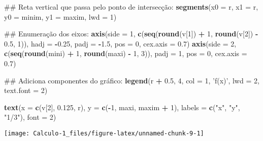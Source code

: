 \documentclass[]{book}
\newenvironment{Shaded}{\begin{snugshade}}{\end{snugshade}}
\newcommand{\KeywordTok}[1]{\textcolor[rgb]{0.13,0.29,0.53}{\textbf{#1}}}
\newcommand{\DataTypeTok}[1]{\textcolor[rgb]{0.13,0.29,0.53}{#1}}
\newcommand{\DecValTok}[1]{\textcolor[rgb]{0.00,0.00,0.81}{#1}}
\newcommand{\FloatTok}[1]{\textcolor[rgb]{0.00,0.00,0.81}{#1}}
\newcommand{\StringTok}[1]{\textcolor[rgb]{0.31,0.60,0.02}{#1}}
\newcommand{\OperatorTok}[1]{\textcolor[rgb]{0.81,0.36,0.00}{\textbf{#1}}}
\newcommand{\NormalTok}[1]{#1}
\begin{document}
\begin{enumerate}
\begin{Shaded}
\begin{Highlighting}[]
\NormalTok{##  Reta vertical que passa pelo ponto de intersecção:}
\KeywordTok{segments}\NormalTok{(}\DataTypeTok{x0 =}\NormalTok{ r, }\DataTypeTok{x1 =}\NormalTok{ r,}
     \DataTypeTok{y0 =}\NormalTok{ minim, }\DataTypeTok{y1 =}\NormalTok{ maxim, }\DataTypeTok{lwd =} \DecValTok{1}\NormalTok{)}

\NormalTok{##  Enumeração dos eixos:}
\KeywordTok{axis}\NormalTok{(}\DataTypeTok{side =} \DecValTok{1}\NormalTok{, }\KeywordTok{c}\NormalTok{(}\KeywordTok{seq}\NormalTok{(}\KeywordTok{round}\NormalTok{(v[}\DecValTok{1}\NormalTok{]) }\OperatorTok{+}\StringTok{ }\DecValTok{1}\NormalTok{, }\KeywordTok{round}\NormalTok{(v[}\DecValTok{2}\NormalTok{]) }\OperatorTok{-}\StringTok{ }\FloatTok{0.5}\NormalTok{, }\DecValTok{1}\NormalTok{)),}
 \DataTypeTok{hadj =} \OperatorTok{-}\FloatTok{0.25}\NormalTok{, }\DataTypeTok{padj =} \OperatorTok{-}\FloatTok{1.5}\NormalTok{, }\DataTypeTok{pos =} \DecValTok{0}\NormalTok{, }\DataTypeTok{cex.axis =} \FloatTok{0.7}\NormalTok{)}
\KeywordTok{axis}\NormalTok{(}\DataTypeTok{side =} \DecValTok{2}\NormalTok{, }\KeywordTok{c}\NormalTok{(}\KeywordTok{seq}\NormalTok{(}\KeywordTok{round}\NormalTok{(mini) }\OperatorTok{+}\StringTok{ }\DecValTok{1}\NormalTok{, }\KeywordTok{round}\NormalTok{(maxi) }\OperatorTok{-}\StringTok{ }\DecValTok{1}\NormalTok{, }\DecValTok{3}\NormalTok{)),}
 \DataTypeTok{padj =} \DecValTok{1}\NormalTok{, }\DataTypeTok{pos =} \DecValTok{0}\NormalTok{, }\DataTypeTok{cex.axis =} \FloatTok{0.7}\NormalTok{)}

\NormalTok{##  Adiciona componentes do gráfico:}
\KeywordTok{legend}\NormalTok{(r }\OperatorTok{+}\StringTok{ }\FloatTok{0.5}\NormalTok{, }\DecValTok{4}\NormalTok{, }\DataTypeTok{col =} \DecValTok{1}\NormalTok{, }\StringTok{'f(x)'}\NormalTok{, }\DataTypeTok{lwd =} \DecValTok{2}\NormalTok{, }\DataTypeTok{text.font =} \DecValTok{2}\NormalTok{)}

\KeywordTok{text}\NormalTok{(}\DataTypeTok{x =} \KeywordTok{c}\NormalTok{(v[}\DecValTok{2}\NormalTok{], }\FloatTok{0.125}\NormalTok{, r), }\DataTypeTok{y =} \KeywordTok{c}\NormalTok{(}\OperatorTok{-}\DecValTok{1}\NormalTok{, maxi, maxim }\OperatorTok{+}\StringTok{ }\DecValTok{1}\NormalTok{),}
 \DataTypeTok{labels =} \KeywordTok{c}\NormalTok{(}\StringTok{"x"}\NormalTok{, }\StringTok{"y"}\NormalTok{, }\StringTok{"1/3"}\NormalTok{), }\DataTypeTok{font =} \DecValTok{2}\NormalTok{)  }
\end{Highlighting}
\end{Shaded}

  \begin{center}\texttt{[image: Calculo-1\_files/figure-latex/unnamed-chunk-9-1]} \end{center}


\end{enumerate}
\end{document}
